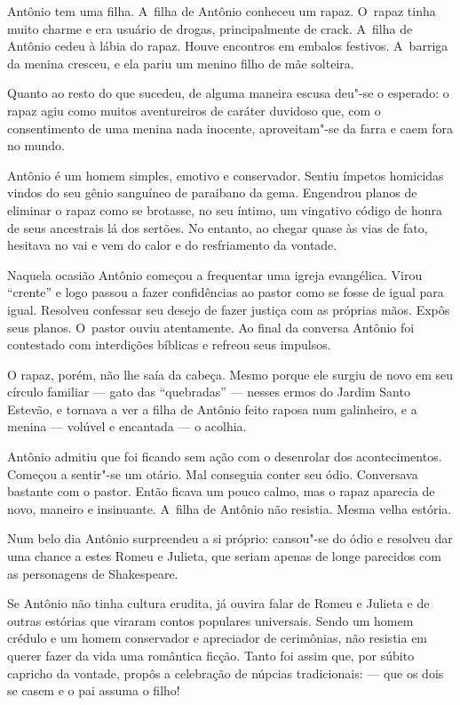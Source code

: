 Antônio tem uma filha. A~filha de Antônio conheceu um rapaz. O~rapaz
tinha muito charme e era usuário de drogas, principalmente de crack. A~filha de Antônio cedeu à lábia do rapaz. Houve encontros em embalos
festivos. A~barriga da menina cresceu, e ela pariu um menino filho de
mãe solteira.

Quanto ao resto do que sucedeu, de alguma maneira escusa deu"-se o
esperado: o rapaz agiu como muitos aventureiros de caráter duvidoso que,
com o consentimento de uma menina nada inocente, aproveitam"-se da farra
e caem fora no mundo.

Antônio é um homem simples, emotivo e conservador. Sentiu ímpetos
homicidas vindos do seu gênio sanguíneo de paraibano da gema. Engendrou
planos de eliminar o rapaz como se brotasse, no seu íntimo, um vingativo
código de honra de seus ancestrais lá dos sertões. No entanto, ao chegar
quase às vias de fato, hesitava no vai e vem do calor e do resfriamento
da vontade.

Naquela ocasião Antônio começou a frequentar uma igreja evangélica.
Virou ``crente'' e logo passou a fazer confidências ao pastor como se
fosse de igual para igual. Resolveu confessar seu desejo de fazer
justiça com as próprias mãos. Expôs seus planos. O~pastor ouviu
atentamente. Ao final da conversa Antônio foi contestado com interdições
bíblicas e refreou seus impulsos.

O rapaz, porém, não lhe saía da cabeça. Mesmo porque ele surgiu de novo
em seu círculo familiar --- gato das ``quebradas'' --- nesses ermos do
Jardim Santo Estevão, e tornava a ver a filha de Antônio feito raposa
num galinheiro, e a menina --- volúvel e encantada --- o acolhia.

Antônio admitiu que foi ficando sem ação com o desenrolar dos
acontecimentos. Começou a sentir"-se um otário. Mal conseguia conter seu
ódio. Conversava bastante com o pastor. Então ficava um pouco calmo, mas
o rapaz aparecia de novo, maneiro e insinuante. A~filha de Antônio não
resistia. Mesma velha estória.

Num belo dia Antônio surpreendeu a si próprio: cansou"-se do ódio e
resolveu dar uma chance a estes Romeu e Julieta, que seriam apenas de
longe parecidos com as personagens de Shakespeare.

Se Antônio não tinha cultura erudita, já ouvira falar de Romeu e Julieta
e de outras estórias que viraram contos populares universais. Sendo um
homem crédulo e um homem conservador e apreciador de cerimônias, não
resistia em querer fazer da vida uma romântica ficção. Tanto foi assim
que, por súbito capricho da vontade, propôs a celebração de núpcias
tradicionais: --- que os dois se casem e o pai assuma o filho!

